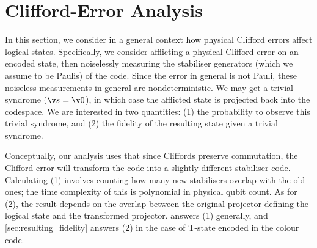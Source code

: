 \section{Clifford-Error Analysis}
\label{sec:clifford_error_analysis}

In this section,
we consider in a general context how physical Clifford errors
affect logical states.
Specifically,
we consider afflicting a physical Clifford error on an encoded state,
then noiselessly measuring the stabiliser generators
(which we assume to be Paulis)
of the code.
Since the error in general is not Pauli,
these noiseless measurements in general are nondeterministic.
We may get a trivial syndrome ($\v s =\v 0$),
in which case the afflicted state is projected back into the codespace.
We are interested in two quantities:
(1) the probability to observe this trivial syndrome,
and (2) the fidelity of the resulting state given a trivial syndrome.

Conceptually,
our analysis uses that since Cliffords preserve commutation,
the Clifford error will transform the code
into a slightly different stabiliser code.
Calculating (1) involves counting
how many new stabilisers overlap with the old ones;
the time complexity of this is
polynomial in physical qubit count.
As for (2),
the result depends on the overlap between
the original projector defining the logical state
and the transformed projector.
 answers (1) generally,
and \cref{sec:resulting_fidelity} answers (2)
in the case of T-state encoded in the colour code.

